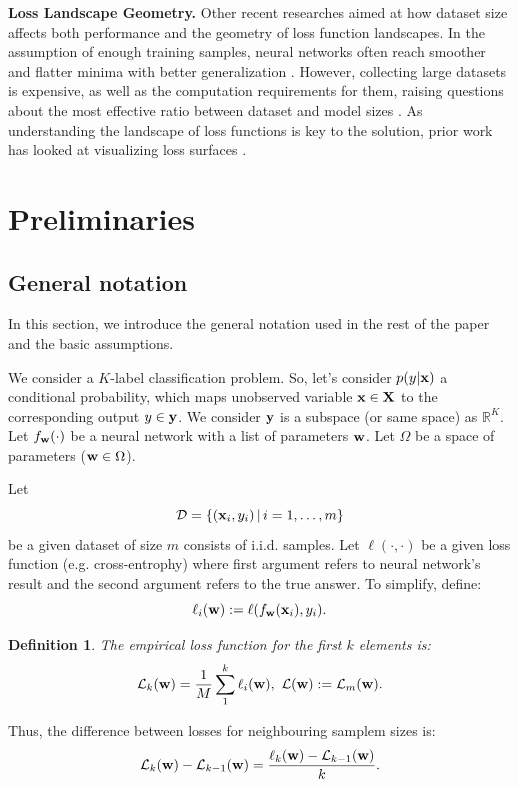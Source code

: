 \documentclass{article}
\newtheorem{definition}{Definition}
\begin{document}
\textbf{Loss Landscape Geometry.}
Other recent researches aimed at how dataset size affects both performance and the geometry of loss function landscapes.
In the assumption of enough training samples, neural networks often reach smoother and flatter minima with better
generalization \cite{wu2017towards}. However, collecting large datasets is expensive, as well as the computation
requirements for them, raising questions about the most effective ratio between dataset and model sizes
\cite{hoffmann2022training}. As understanding the landscape of loss functions is key to the solution, prior work has looked
at visualizing loss surfaces \cite{li2018visualizing}.

\section{Preliminaries}\label{sec:prelim}

\subsection{General notation}

In this section, we introduce the general notation used in the rest of the paper and the basic assumptions.

We consider a $K$-label classification problem.
So, let's consider $p(y|\mathbf{x})$ a conditional probability, which maps unobserved variable $\mathbf{x} \in \mathbf{X}$ to the corresponding
output $y \in \mathbf{y}$. We consider $\mathbf{y}$ is a subspace (or same space) as $\mathbb{R}^K$. Let $f_{\mathbf{w}}(\cdot)$
be a neural network with a list of parameters $\mathbf{w}$. Let $\Omega$ be a space of parameters ($\mathbf{w} \in \Omega$).

Let
$$\mathcal{D} = \left\{ (\mathbf{x}_i, y_i) \, | \, i = 1, \dots, m \right\}$$
be a given dataset of size $m$ consists of i.i.d.
samples. Let $\ell(\cdot, \cdot)$ be a given loss function (e.g. cross-entrophy) where first argument refers to neural network's
result and the second argument refers to the true answer. To simplify, define:
$$\ell_i(\mathbf{w}) := \ell(f_{\mathbf{w}}(\mathbf{x}_i), y_i).$$

\begin{definition}
  The empirical loss function for the first $k$ elements is:
  $$\mathcal{L}_k(\mathbf{w}) = \frac1M \sum\limits_1^k \ell_i(\mathbf{w}), \,\, \mathcal{L}(\mathbf{w}) := \mathcal{L}_m(\mathbf{w}).$$
\end{definition}

Thus, the difference between losses for neighbouring samplem sizes is:
$$\mathcal{L}_{k}(\mathbf{w}) - \mathcal{L}_{k-1}(\mathbf{w}) = \frac{\ell_{k}(\mathbf{w}) - \mathcal{L}_{k-1}(\mathbf{w})}{k}.$$
\end{document}
